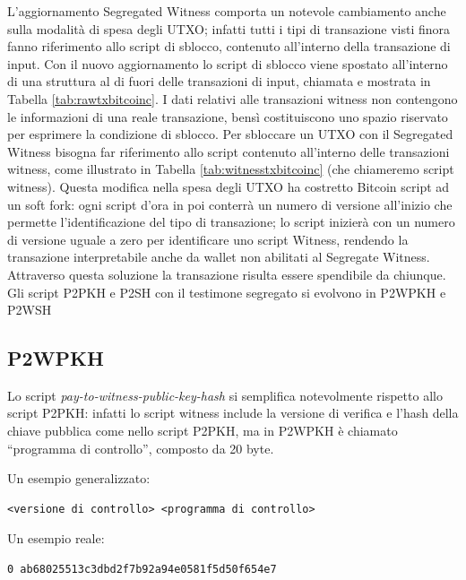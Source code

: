 L’aggiornamento Segregated Witness comporta un notevole cambiamento anche sulla modalità di spesa degli UTXO; infatti tutti i tipi di transazione visti finora fanno riferimento allo script di sblocco, contenuto all’interno della transazione di input.
Con il nuovo aggiornamento lo script di sblocco viene spostato all’interno di una struttura al di fuori delle transazioni di input, chiamata  e mostrata in Tabella \ref{tab:rawtxbitcoinc}.
I dati relativi alle transazioni witness non contengono le informazioni di una reale transazione, bensì costituiscono uno spazio riservato per esprimere la condizione di sblocco.
Per sbloccare un UTXO con il Segregated Witness bisogna far riferimento allo script contenuto all’interno delle transazioni witness, come illustrato in Tabella \ref{tab:witnesstxbitcoinc} (che chiameremo script witness). Questa modifica nella spesa degli UTXO ha costretto Bitcoin script ad un soft fork: ogni script d’ora in poi conterrà un numero di versione all’inizio che permette l’identificazione del tipo di transazione; lo script inizierà con un numero di versione uguale a zero per identificare uno script Witness, rendendo la transazione interpretabile anche da wallet non abilitati al Segregate Witness. Attraverso questa soluzione la transazione risulta essere spendibile da chiunque.
Gli script P2PKH e P2SH con il testimone segregato si evolvono in P2WPKH e P2WSH

\subsection{P2WPKH}

Lo script {\it pay-to-witness-public-key-hash \/} si semplifica notevolmente rispetto allo script P2PKH: infatti lo script witness include la versione di verifica e l’hash della chiave pubblica come nello script  P2PKH,  ma in P2WPKH è chiamato “programma di controllo”, composto da 20 byte.

Un esempio generalizzato:
\begin{lstlisting}[language=bitcoinscript, label={code:generalexamplep2wpkh}, caption={Esempio generale della struttura di uno script P2WPKH.}]
<versione di controllo> <programma di controllo>
\end{lstlisting}

Un esempio reale:
\begin{lstlisting}[language=bitcoinscript, label={code:xamplep2wpkh}, caption={Esempio reale di uno script P2WPKH.}]
0 ab68025513c3dbd2f7b92a94e0581f5d50f654e7
\end{lstlisting}

